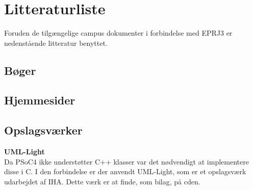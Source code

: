 \chapter{Litteraturliste}
Foruden de tilgængelige campus dokumenter i forbindelse med EPRJ3 er nedenstående litteratur benyttet. 

\section{Bøger}



\section{Hjemmesider}



\section{Opslagsværker}

\textbf{UML-Light}\\
Da PSoC4 ikke understøtter C++ klasser var det nødvendigt at implementere disse i C. I den forbindelse er der anvendt UML-Light, som er et opslagsværk udarbejdet af IHA. Dette værk er at finde, som bilag, på cden. 